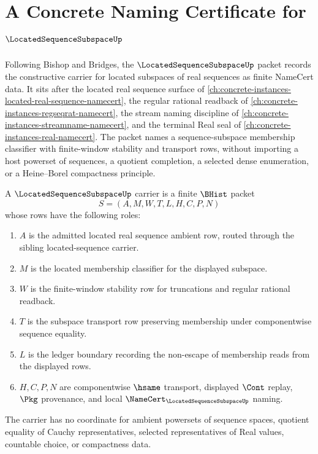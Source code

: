 \chapter{A Concrete Naming Certificate for $\LocatedSequenceSubspaceUp$}
\label{ch:concrete-instances-located-sequence-subspace-namecert}

Following Bishop and Bridges, the $\LocatedSequenceSubspaceUp$ packet records the constructive carrier for located subspaces of real sequences as finite NameCert data. It sits after the located real sequence surface of \autoref{ch:concrete-instances-located-real-sequence-namecert}, the regular rational readback of \autoref{ch:concrete-instances-regseqrat-namecert}, the stream naming discipline of \autoref{ch:concrete-instances-streamname-namecert}, and the terminal Real seal of \autoref{ch:concrete-instances-real-namecert}. The packet names a sequence-subspace membership classifier with finite-window stability and transport rows, without importing a host powerset of sequences, a quotient completion, a selected dense enumeration, or a Heine--Borel compactness principle.

\begin{definition}
\label{def:located-sequence-subspace-carrier}
A $\LocatedSequenceSubspaceUp$ carrier is a finite $\BHist$ packet
$$
S=(A,M,W,T,L,H,C,P,N)
$$
whose rows have the following roles:
\begin{enumerate}
\item $A$ is the admitted located real sequence ambient row, routed through the sibling located-sequence carrier.
\item $M$ is the located membership classifier for the displayed subspace.
\item $W$ is the finite-window stability row for truncations and regular rational readback.
\item $T$ is the subspace transport row preserving membership under componentwise sequence equality.
\item $L$ is the ledger boundary recording the non-escape of membership reads from the displayed rows.
\item $H,C,P,N$ are componentwise $\hsame$ transport, displayed $\Cont$ replay, $\Pkg$ provenance, and local $\NameCert_{\LocatedSequenceSubspaceUp}$ naming.
\end{enumerate}
The carrier has no coordinate for ambient powersets of sequence spaces, quotient equality of Cauchy representatives, selected representatives of Real values, countable choice, or compactness data.
\end{definition}

